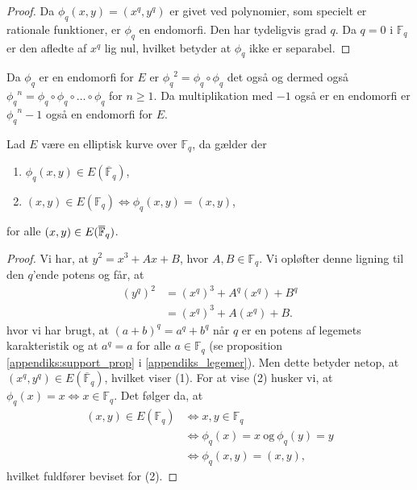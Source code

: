 \begin{proof}
Da $\phi_q(x, y) = (x^q, y^q)$ er givet ved polynomier, som specielt er rationale funktioner, er $\phi_q$ en endomorfi. Den har tydeligvis grad $q$. Da $q=0$ i $\mathbb{F}_q$ er den afledte af $x^q$ lig nul, hvilket betyder at $\phi_q$ ikke er separabel.
\end{proof}

\begin{remark}
Da $\phi_q$ er en endomorfi for $E$ er ${\phi_q}^2 = \phi_q \circ \phi_q$ det også og dermed også 
${\phi_q}^n = \phi_q \circ \phi_q \circ \ldots \circ \phi_q$ for $n \geq 1$. Da multiplikation med $-1$ også er en endomorfi er ${\phi_q}^n - 1$ også en endomorfi for $E$.
\end{remark}

\begin{lemma}
\label{lemma03}
Lad $E$ være en elliptisk kurve over $\mathbb{F}_q$, da gælder der
\begin{enumerate}
	\item $\phi_q(x, y) \in E(\overline{\mathbb{F}}_q)$,
	\item $(x, y) \in E(\mathbb{F}_q) \Leftrightarrow \phi_q(x, y)=(x, y)$,
\end{enumerate}
for alle $(x, y) \in E(\overline{\mathbb{F}}_q)$.
\end{lemma}
\begin{proof}
Vi har, at $y^2 = x^3 + Ax + B$, hvor $A, B \in \mathbb{F}_q$. Vi opløfter 
denne ligning til den $q$'ende potens og får, at 
\begin{align*}
	(y^q)^2 &= (x^q)^3 + A^q (x^q) + B^q \\
	&= (x^q)^3 + A (x^q) + B.
\end{align*}
hvor vi har brugt, at $(a+b)^q = a^q + b^q$ når $q$ er en potens af legemets karakteristik 
og at $a^q = a$ for alle $a \in \mathbb{F}_q$ (se proposition \ref{appendiks:support_prop} i \ref{appendiks_legemer}).
Men dette betyder netop, at 
$(x^q, y^q) \in E(\overline{\mathbb{F}}_q)$, hvilket viser (1).
For at vise (2) husker vi, at $\phi_q(x) = x \Leftrightarrow x \in \mathbb{F}_q$.
Det følger da, at 
\begin{align*}
	(x, y) \in E(\mathbb{F}_q) &\Leftrightarrow x, y \in \mathbb{F}_q \\
	&\Leftrightarrow \phi_q(x) = x \ \text{og} \ \phi_q(y) = y \\
	&\Leftrightarrow \phi_q(x, y) = (x, y),
\end{align*}
hvilket fuldfører beviset for (2).
\end{proof}

